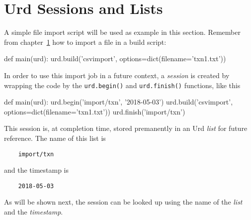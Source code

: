 







\section{Urd Sessions and Lists}

A simple file import script will be used as example in this section.
Remember from chapter~\ref{} how to import a file in a build script:
\begin{python}
def main(urd):
    urd.build('csvimport', options=dict(filename='txn1.txt'))
\end{python}
In order to use this import job in a future context,
a \textsl{session} is created by wrapping the code by
the \texttt{urd.begin()} and \texttt{urd.finish()} functions, like this
\begin{python}
def main(urd):
    urd.begin('import/txn', '2018-05-03')
    urd.build('csvimport', options=dict(filename='txn1.txt'))
    urd.finish('import/txn')
\end{python}
This session is, at completion time, stored premanently in an
Urd \textsl{list} for future reference.  The name of this list is
\begin{verbatim}
    import/txn
\end{verbatim}
and the timestamp is
\begin{verbatim}
    2018-05-03
\end{verbatim}
As will be shown next, the session can be looked up using the name of
the \textsl{list} and the \textsl{timestamp}.




